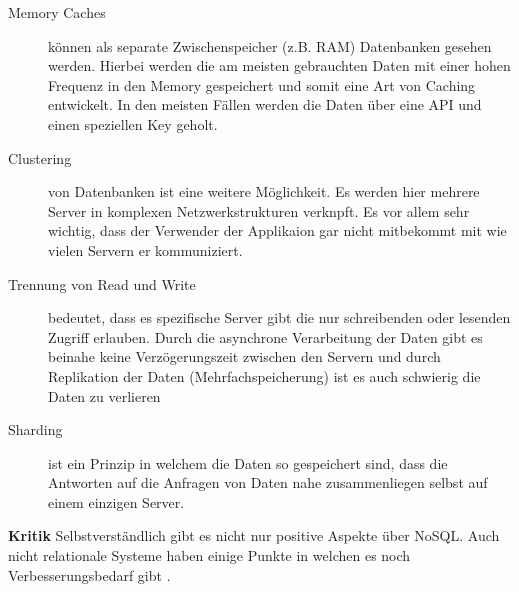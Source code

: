 \begin{description}
	\item[Memory Caches] können als separate Zwischenspeicher (z.B. RAM) Datenbanken gesehen werden. Hierbei werden die am meisten gebrauchten Daten mit einer hohen Frequenz in den Memory gespeichert und somit eine Art von Caching entwickelt. In den meisten Fällen werden die Daten über eine API und einen speziellen Key geholt.

	\item[Clustering] von Datenbanken ist eine weitere Möglichkeit. Es werden hier mehrere Server in komplexen Netzwerkstrukturen verknpft. Es vor allem sehr wichtig, dass der Verwender der Applikaion gar nicht mitbekommt mit wie vielen Servern er kommuniziert.

	\item[Trennung von Read und Write] bedeutet, dass es spezifische Server gibt die nur schreibenden oder lesenden Zugriff erlauben. Durch die asynchrone Verarbeitung der Daten gibt es beinahe keine Verzögerungszeit zwischen den Servern und durch Replikation der Daten (Mehrfachspeicherung) ist es auch schwierig die Daten zu verlieren

	\item[Sharding] ist ein Prinzip in welchem die Daten so gespeichert sind, dass die Antworten auf die Anfragen von Daten nahe zusammenliegen selbst auf einem einzigen Server.
\end{description}

\textbf{Kritik\newline}
Selbstverständlich gibt es nicht nur positive Aspekte über NoSQL. Auch nicht relationale Systeme haben einige Punkte in welchen es noch Verbesserungsbedarf gibt \cite{MELD.CH2-noSQL.sqlvsnosql}. 

